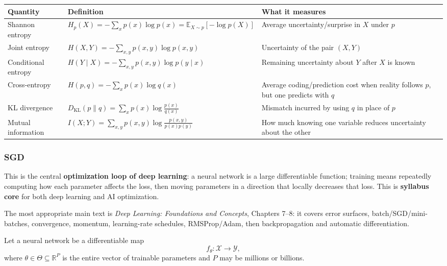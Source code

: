 \documentclass[11pt,a4paper]{article}
\theoremstyle{definition}
\begin{document}
{\footnotesize
\setlength{\tabcolsep}{3pt}
\renewcommand{\arraystretch}{1.2}
\noindent
\begin{tabularx}{\linewidth}{|
  >{\raggedright\arraybackslash}p{2.5cm}|
  >{\raggedright\arraybackslash}X|
  >{\raggedright\arraybackslash}X|
}
\hline
\textbf{Quantity} & \textbf{Definition} & \textbf{What it measures} \\
\hline
Shannon entropy & $H_p(X) = -\sum_{x} p(x) \log p(x) = \mathbb{E}_{X \sim p}[-\log p(X)]$ & Average uncertainty/surprise in $X$ under $p$ \\
\hline
Joint entropy & $H(X, Y) = -\sum_{x,y} p(x, y) \log p(x, y)$ & Uncertainty of the pair $(X, Y)$ \\
\hline
Conditional entropy & $H(Y \mid X) = -\sum_{x,y} p(x, y) \log p(y \mid x)$ & Remaining uncertainty about $Y$ after $X$ is known \\
\hline
Cross-entropy & $H(p, q) = -\sum_{x} p(x) \log q(x)$ & Average coding/prediction cost when reality follows $p$, but one predicts with $q$ \\
\hline
KL divergence & $D_{\text{KL}}(p\|q) = \sum_{x} p(x) \log \frac{p(x)}{q(x)}$ & Mismatch incurred by using $q$ in place of $p$ \\
\hline
Mutual information & $I(X; Y) = \sum_{x,y} p(x, y) \log \frac{p(x, y)}{p(x)p(y)}$ & How much knowing one variable reduces uncertainty about the other \\
\hline
\end{tabularx}
}

\subsubsection{SGD}

This is the central \textbf{optimization loop of deep learning}: a neural network is a large differentiable function; training means repeatedly computing how each parameter affects the loss, then moving parameters in a direction that locally decreases that loss. This is \textbf{syllabus core} for both deep learning and AI optimization.

The most appropriate main text is \textit{Deep Learning: Foundations and Concepts}, Chapters 7--8: it covers error surfaces, batch/SGD/mini-batches, convergence, momentum, learning-rate schedules, RMSProp/Adam, then backpropagation and automatic differentiation. 

Let a neural network be a differentiable map
\[
f_{\theta} : \mathcal{X} \to \mathcal{Y},
\]
where $\theta \in \Theta \subseteq \mathbb{R}^P$ is the entire vector of trainable parameters and $P$ may be millions or billions.
\end{document}
